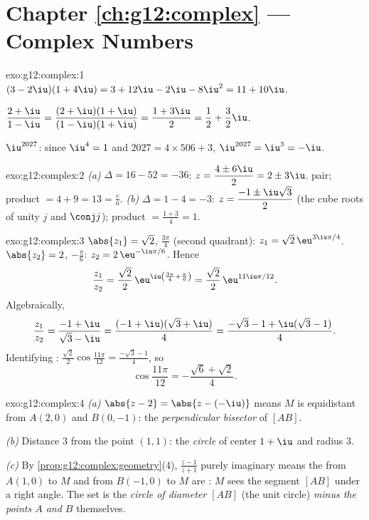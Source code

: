 \section*{Chapter \ref{ch:g12:complex} --- Complex Numbers}

\begin{solution}{exo:g12:complex:1}
$(3-2\iu)(1+4\iu) = 3 + 12\iu - 2\iu - 8\iu^2 = 11 + 10\iu$.

$\dfrac{2+\iu}{1-\iu} = \dfrac{(2+\iu)(1+\iu)}{(1-\iu)(1+\iu)}
= \dfrac{1 + 3\iu}{2} = \dfrac12 + \dfrac32\iu$.

$\iu^{2027}$: since $\iu^4 = 1$ and $2027 = 4 \times 506 + 3$,
$\iu^{2027} = \iu^3 = -\iu$.
\end{solution}

\begin{solution}{exo:g12:complex:2}
\emph{(a)} $\Delta = 16 - 52 = -36$:
$z = \dfrac{4 \pm 6\iu}{2} = 2 \pm 3\iu$.  pair; product
$= 4 + 9 = 13 = \frac ca$. \emph{(b)} $\Delta = 1 - 4 = -3$:
$z = \dfrac{-1 \pm \iu\sqrt3}{2}$ (the cube roots of unity $j$ and
$\conj j$); product $= \frac{1 + 3}{4} = 1$.
\end{solution}

\begin{solution}{exo:g12:complex:3}
$\abs{z_1} = \sqrt2$,  $\frac{3\pi}{4}$ (second quadrant):
$z_1 = \sqrt2\,\eu^{3\iu\pi/4}$.
$\abs{z_2} = 2$,  $-\frac\pi6$:
$z_2 = 2\,\eu^{-\iu\pi/6}$. Hence
\[
\frac{z_1}{z_2} = \frac{\sqrt2}{2}\,\eu^{\iu\left(\frac{3\pi}{4} + \frac{\pi}{6}\right)}
= \frac{\sqrt2}{2}\,\eu^{11\iu\pi/12}.
\]
Algebraically,
\[
\frac{z_1}{z_2} = \frac{-1+\iu}{\sqrt3 - \iu}
= \frac{(-1+\iu)(\sqrt3+\iu)}{4}
= \frac{-\sqrt3 - 1 + \iu(\sqrt3 - 1)}{4}.
\]
Identifying :
$\frac{\sqrt2}{2}\cos\frac{11\pi}{12} = \frac{-\sqrt3-1}{4}$, so
\[
\cos\frac{11\pi}{12} = -\frac{\sqrt6 + \sqrt2}{4}.
\]
\end{solution}

\begin{solution}{exo:g12:complex:4}
\emph{(a)} $\abs{z - 2} = \abs{z - (-\iu)}$ means $M$ is equidistant from
$A(2, 0)$ and $B(0, -1)$: the \emph{perpendicular bisector} of $[AB]$.

\emph{(b)} Distance $3$ from the point $(1,1)$: the \emph{circle} of center
$1 + \iu$ and radius $3$.

\emph{(c)} By \cref{prop:g12:complex:geometry}(4), $\frac{z-1}{z+1}$ purely
imaginary means the  from $A(1,0)$ to $M$ and from $B(-1,0)$ to $M$
are : $M$ sees the segment $[AB]$ under a right angle. The set is
the \emph{circle of diameter $[AB]$} (the unit circle) \emph{minus the
points $A$ and $B$} themselves.
\end{solution}

